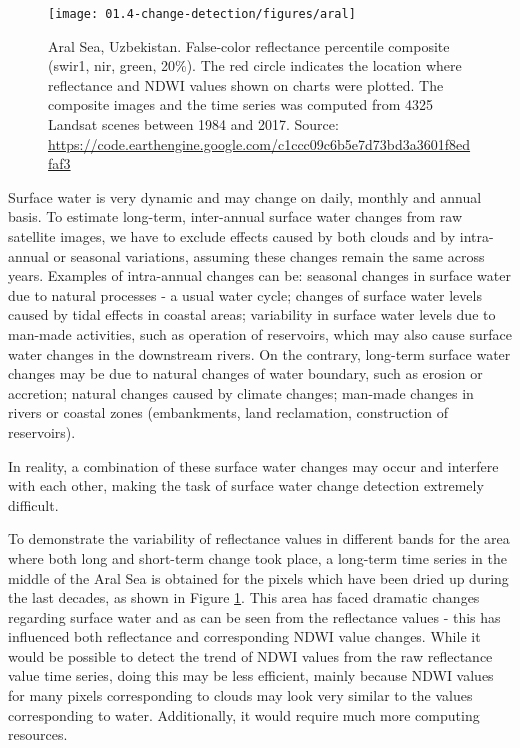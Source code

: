 \begin{figure}[H]
	\texttt{[image: 01.4-change-detection/figures/aral]}
	\caption{Aral Sea, Uzbekistan. False-color reflectance percentile composite (swir1, nir, green, 20\%). The red circle indicates the location where reflectance and NDWI values shown on charts were plotted. The composite images and the time series was computed from 4325 Landsat scenes between 1984 and 2017. Source: \url{https://code.earthengine.google.com/c1ccc09c6b5e7d73bd3a3601f8edfaf3}}
	\label{fig:ch4-aral-sea}
\end{figure}

Surface water is very dynamic and may change on daily, monthly and annual basis. To estimate long-term, inter-annual surface water changes from raw satellite images, we have to exclude effects caused by both clouds and by intra-annual or seasonal variations, assuming these changes remain the same across years. Examples of intra-annual changes can be: seasonal changes in surface water due to natural processes - a usual water cycle; changes of surface water levels caused by tidal effects in coastal areas; variability in surface water levels due to man-made activities, such as operation of reservoirs, which may also cause surface water changes in the downstream rivers. On the contrary, long-term surface water changes may be due to natural changes of water boundary, such as erosion or accretion; natural changes caused by climate changes; man-made changes in rivers or coastal zones (embankments, land reclamation, construction of reservoirs). 

In reality, a combination of these surface water changes may occur and interfere with each other, making the task of surface water change detection extremely difficult.

To demonstrate the variability of reflectance values in different bands for the area where both long and short-term change took place, a long-term time series in the middle of the Aral Sea is obtained for the pixels which have been dried up during the last decades, as shown in Figure \ref{fig:ch4-aral-sea}. This area has faced dramatic changes regarding surface water and as can be seen from the reflectance values - this has influenced both reflectance and corresponding NDWI value changes. While it would be possible to detect the trend of NDWI values from the raw reflectance value time series, doing this may be less efficient, mainly because NDWI values for many pixels corresponding to clouds may look very similar to the values corresponding to water. Additionally, it would require much more computing resources.

